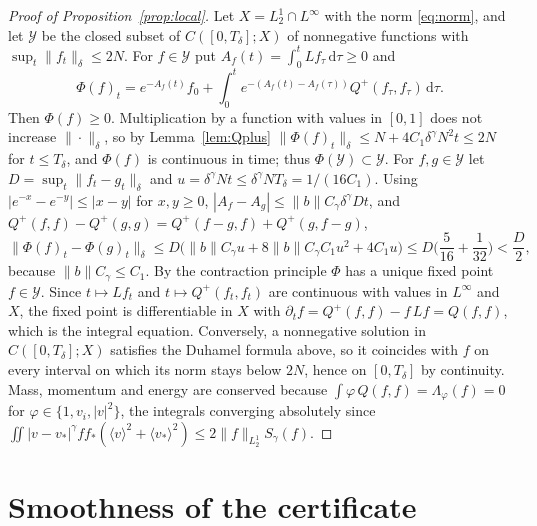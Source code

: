 \documentclass[11pt]{amsart}
\theoremstyle{definition}
\newcommand{\dd}{\,\mathrm{d}}
\newcommand{\jb}[1]{\langle #1\rangle}
\newcommand{\nb}{\|b\|}
\begin{document}
\begin{proof}[Proof of Proposition~\ref{prop:local}]
Let $X=L^1_2\cap L^\infty$ with the norm \eqref{eq:norm}, and let $\mathcal Y$ be the closed subset of $C([0,T_\delta];X)$ of nonnegative functions with $\sup_t\|f_t\|_\delta\le2N$. For $f\in\mathcal Y$ put $A_f(t)=\int_0^tLf_\tau\dd\tau\ge0$ and
\[
\Phi(f)_t=e^{-A_f(t)}f_0+\int_0^te^{-(A_f(t)-A_f(\tau))}Q^+(f_\tau,f_\tau)\dd\tau .
\]
Then $\Phi(f)\ge0$. Multiplication by a function with values in $[0,1]$ does not increase $\|\cdot\|_\delta$, so by Lemma~\ref{lem:Qplus} $\|\Phi(f)_t\|_\delta\le N+4C_1\delta^\gamma N^2t\le2N$ for $t\le T_\delta$, and $\Phi(f)$ is continuous in time; thus $\Phi(\mathcal Y)\subset\mathcal Y$. For $f,g\in\mathcal Y$ let $D=\sup_t\|f_t-g_t\|_\delta$ and $u=\delta^\gamma Nt\le\delta^\gamma NT_\delta=1/(16C_1)$. Using $|e^{-x}-e^{-y}|\le|x-y|$ for $x,y\ge0$, $|A_f-A_g|\le\nb C_\gamma\delta^\gamma Dt$, and $Q^+(f,f)-Q^+(g,g)=Q^+(f-g,f)+Q^+(g,f-g)$,
\[
\|\Phi(f)_t-\Phi(g)_t\|_\delta\le D\big(\nb C_\gamma u+8\nb C_\gamma C_1u^2+4C_1u\big)\le D\Big(\frac5{16}+\frac1{32}\Big)<\frac D2 ,
\]
because $\nb C_\gamma\le C_1$. By the contraction principle $\Phi$ has a unique fixed point $f\in\mathcal Y$. Since $t\mapsto Lf_t$ and $t\mapsto Q^+(f_t,f_t)$ are continuous with values in $L^\infty$ and $X$, the fixed point is differentiable in $X$ with $\partial_tf=Q^+(f,f)-f\,Lf=Q(f,f)$, which is the integral equation. Conversely, a nonnegative solution in $C([0,T_\delta];X)$ satisfies the Duhamel formula above, so it coincides with $f$ on every interval on which its norm stays below $2N$, hence on $[0,T_\delta]$ by continuity. Mass, momentum and energy are conserved because $\int\varphi\,Q(f,f)=\Lambda_\varphi(f)=0$ for $\varphi\in\{1,v_i,|v|^2\}$, the integrals converging absolutely since $\iint|v-v_*|^\gamma ff_*(\jb{v}^2+\jb{v_*}^2)\le2\|f\|_{L^1_2}S_\gamma(f)$.
\end{proof}

\section{Smoothness of the certificate}\label{app:smooth}
\end{document}
